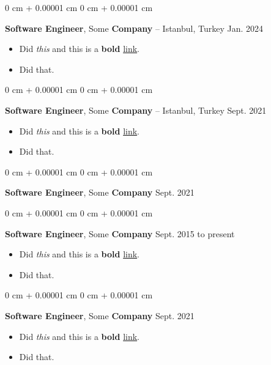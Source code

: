 \documentclass[10pt, letterpaper]{article}
\newenvironment{highlights}{
    \begin{itemize}[
        topsep=0.10 cm,
        parsep=0.10 cm,
        partopsep=0pt,
        itemsep=0pt,
        leftmargin=0 cm + 10pt
    ]
}{
    \end{itemize}
        
    \vspace{-0.20cm}
} %
\newenvironment{onecolentry}{
    \begin{adjustwidth}{
        0 cm + 0.00001 cm
    }{
        0 cm + 0.00001 cm
    }
}{
    \end{adjustwidth}
} %
\begin{document}
        \begin{onecolentry}
            \textbf{Software Engineer}, Some \textbf{Company} -- Istanbul, Turkey \hfill Jan. 2024
            \begin{highlights}
                \item Did \textit{this} and this is a \textbf{bold} \href{https://example.com}{link}.
                \item Did that.
            \end{highlights}
        \end{onecolentry}

        \vspace{0.1 cm}

        \begin{onecolentry}
            \textbf{Software Engineer}, Some \textbf{Company} -- Istanbul, Turkey \hfill Sept. 2021
            \begin{highlights}
                \item Did \textit{this} and this is a \textbf{bold} \href{https://example.com}{link}.
                \item Did that.
            \end{highlights}
        \end{onecolentry}

        \vspace{0.1 cm}

        \begin{onecolentry}
            \textbf{Software Engineer}, Some \textbf{Company} \hfill Sept. 2021
        \end{onecolentry}

        \vspace{0.1 cm}

        \begin{onecolentry}
            \textbf{Software Engineer}, Some \textbf{Company} \hfill Sept. 2015 to present
            \begin{highlights}
                \item Did \textit{this} and this is a \textbf{bold} \href{https://example.com}{link}.
                \item Did that.
            \end{highlights}
        \end{onecolentry}

        \vspace{0.1 cm}

        \begin{onecolentry}
            \textbf{Software Engineer}, Some \textbf{Company} \hfill Sept. 2021
            \begin{highlights}
                \item Did \textit{this} and this is a \textbf{bold} \href{https://example.com}{link}.
                \item Did that.
            \end{highlights}
        \end{onecolentry}
\end{document}
